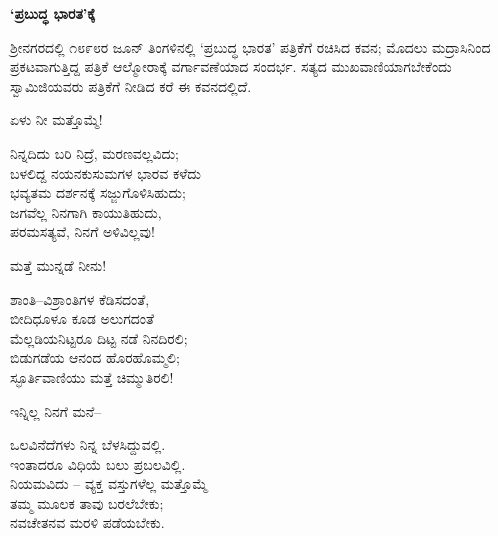 \begin{myquote}
\end{myquote}

\selectkan

\begin{center}
\textbf{‘ಪ್ರಬುದ್ಧ ಭಾರತ’ಕ್ಕೆ}
\end{center}

ಶ‍್ರೀನಗರದಲ್ಲಿ ೧೮೯೮ರ ಜೂನ್ ತಿಂಗಳಿನಲ್ಲಿ ‘ಪ್ರಬುದ್ಧ ಭಾರತ’ ಪತ್ರಿಕೆಗೆ ರಚಿಸಿದ ಕವನ; ಮೊದಲು ಮದ್ರಾಸಿನಿಂದ ಪ್ರಕಟವಾಗುತ್ತಿದ್ದ ಪತ್ರಿಕೆ ಆಲ್ಮೋರಾಕ್ಕೆ ವರ್ಗಾವಣೆಯಾದ ಸಂದರ್ಭ. ಸತ್ಯದ ಮುಖವಾಣಿಯಾಗಬೇಕೆಂದು ಸ್ವಾಮಿಜಿಯವರು ಪತ್ರಿಕೆಗೆ ನೀಡಿದ ಕರೆ ಈ ಕವನದಲ್ಲಿದೆ.

ಏಳು ನೀ ಮತ್ತೊಮ್ಮೆ!

\begin{myquote}
ನಿನ್ನದಿದು ಬರಿ ನಿದ್ರೆ, ಮರಣವಲ್ಲವಿದು;\\ಬಳಲಿದ್ದ ನಯನಕುಸುಮಗಳ ಭಾರವ ಕಳೆದು\\ಭವ್ಯತಮ ದರ್ಶನಕ್ಕೆ ಸಜ್ಜುಗೊಳಿಸಿಹುದು;\\ಜಗವೆಲ್ಲ ನಿನಗಾಗಿ ಕಾಯುತಿಹುದು,\\ಪರಮಸತ್ಯವೆ, ನಿನಗೆ ಅಳಿವಿಲ್ಲವು!
\end{myquote}

ಮತ್ತೆ ಮುನ್ನಡೆ ನೀನು!

\begin{myquote}
ಶಾಂತಿ–ವಿಶ್ರಾಂತಿಗಳ ಕೆಡಿಸದಂತೆ,\\ಬೀದಿಧೂಳೂ ಕೂಡ ಅಲುಗದಂತೆ\\ಮೆಲ್ಲಡಿಯನಿಟ್ಟರೂ ದಿಟ್ಟ ನಡೆ ನಿನದಿರಲಿ;\\ಬಿಡುಗಡೆಯ ಆನಂದ ಹೊರಹೊಮ್ಮಲಿ;\\ಸ್ಫೂರ್ತಿವಾಣಿಯು ಮತ್ತೆ ಚಿಮ್ಮುತಿರಲಿ!
\end{myquote}

ಇನ್ನಿಲ್ಲ ನಿನಗೆ ಮನೆ–

\begin{myquote}
ಒಲವಿನೆದೆಗಳು ನಿನ್ನ ಬೆಳಸಿದ್ದುವಲ್ಲಿ.\\ಇಂತಾದರೂ ವಿಧಿಯೆ ಬಲು ಪ್ರಬಲವಿಲ್ಲಿ.\\ನಿಯಮವಿದು – ವ್ಯಕ್ತ ವಸ್ತುಗಳೆಲ್ಲ ಮತ್ತೊಮ್ಮೆ\\ತಮ್ಮ ಮೂಲಕ ತಾವು ಬರಲೆಬೇಕು;\\ನವಚೇತನವ ಮರಳಿ ಪಡೆಯಬೇಕು.
\end{myquote}

